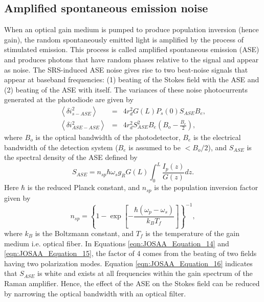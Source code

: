 \subsection{Amplified spontaneous emission noise}

When an optical gain medium is pumped to produce population inversion (hence gain), the random spontaneously emitted light is amplified by the process of stimulated emission. This process is called amplified spontaneous emission (ASE) and produces photons that have random phases relative to the signal and appear as noise. The SRS-induced ASE noise gives rise to two beat-noise signals that appear at baseband frequencies: (1) beating of the Stokes field with the ASE and (2) beating of the ASE with itself. The variances of these noise photocurrents generated at the photodiode are given by \cite{headley2005raman,agrawal2001applications}
\begin{eqnarray}
\left\langle \delta i_{s-ASE}^2\right\rangle &=& 4 r_d^2 G(L) P_s(0) S_{ASE} B_e, \label{eqn:JOSAA_Equation_14}\\
\left\langle \delta i_{ASE-ASE}^2\right\rangle &=& 4 r_d^2 S_{ASE}^2 B_e \left(B_o-\frac{B_e}{2}\right), \label{eqn:JOSAA_Equation_15}
\end{eqnarray}
where $B_o$ is the optical bandwidth of the photodetector, $B_e$ is the electrical bandwidth of the detection system ($B_e$ is assumed to be $< B_o/2$), and $S_{ASE}$ is the spectral density of the ASE defined by \cite{kogelnik1964considerations}
\begin{equation}
S_{ASE} = n_{sp} \hbar \omega_s g_R G(L) \int_0^L {\frac{I_p(z)}{G(z)} dz}.\label{eqn:JOSAA_Equation_16}
\end{equation}
Here $\hbar$ is the reduced Planck constant, and $n_{sp}$ is the population inversion factor given by
\begin{equation}
n_{sp}=\left\{1-\exp\left[-\frac{\hbar (\omega_p-\omega_s)}{k_B T_f}\right]\right\}^{-1},\label{eqn:JOSAA_Equation_17}
\end{equation}
where $k_B$ is the Boltzmann constant, and $T_f$ is the temperature of the gain medium i.e. optical fiber. In Equations \eqref{eqn:JOSAA_Equation_14} and \eqref{eqn:JOSAA_Equation_15}, the factor of 4 comes from the beating of two fields having two polarization modes. Equation \eqref{eqn:JOSAA_Equation_16} indicates that $S_{ASE}$ is white and exists at all frequencies within the gain spectrum of the Raman amplifier. Hence, the effect of the ASE on the Stokes field can be reduced by narrowing the optical bandwidth with an optical filter.

